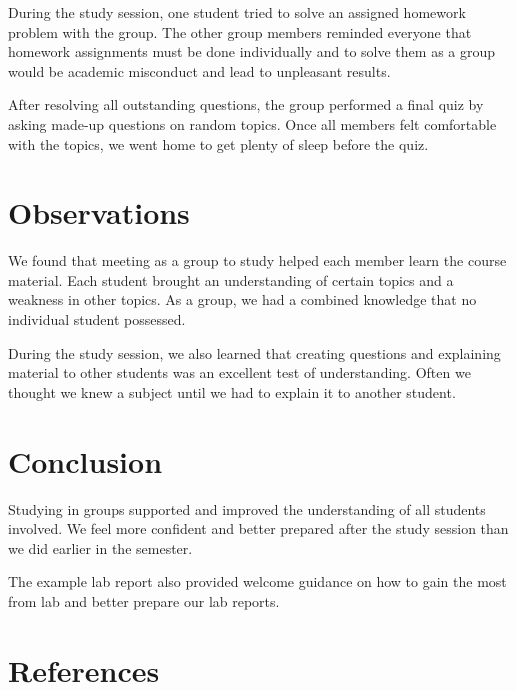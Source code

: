 \documentclass[12pt]{article}
\begin{document}
During the study session, one student tried to solve an assigned homework
problem with the group. The other group members reminded everyone that
homework assignments must be done individually and to solve them as a group
would be academic misconduct and lead to unpleasant results.

After resolving all outstanding questions, the group performed a final quiz by
asking made-up questions on random topics. Once all members felt comfortable
with the topics, we went home to get plenty of sleep before the quiz.

\section{Observations}

We found that meeting as a group to study helped each member learn the course
material. Each student brought an understanding of certain topics and a
weakness in other topics. As a group, we had a combined knowledge that no
individual student possessed.
\nocite{LOGISIM}

During the study session, we also learned that creating questions and explaining
material to other students was an excellent test of understanding. Often we
thought we knew a subject until we had to explain it to another student.

%

\section{Conclusion}

Studying in groups supported and improved the understanding of all students
involved. We feel more confident and better prepared after the study session
than we did earlier in the semester.

The example lab report also provided welcome guidance on how to gain the most
from lab and better prepare our lab reports.


\renewcommand*{\refname}{}
\section{References}
%
%


\end{document}
